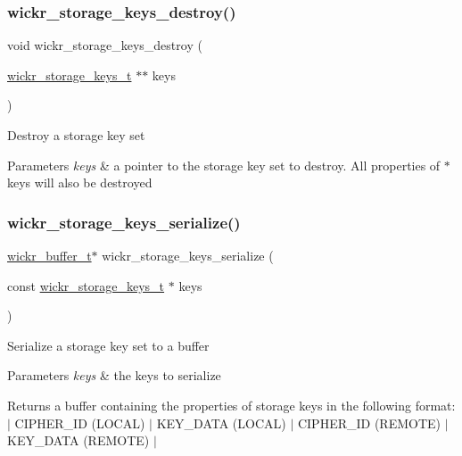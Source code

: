 \subsubsection{\texorpdfstring{wickr\+\_\+storage\+\_\+keys\+\_\+destroy()}{wickr\_storage\_keys\_destroy()}}
{\footnotesize\ttfamily void wickr\+\_\+storage\+\_\+keys\+\_\+destroy (\begin{DoxyParamCaption}\item[{\hyperlink{structwickr__storage__keys}{wickr\+\_\+storage\+\_\+keys\+\_\+t} $\ast$$\ast$}]{keys }\end{DoxyParamCaption})}

Destroy a storage key set


\begin{DoxyParams}{Parameters}
{\em keys} & a pointer to the storage key set to destroy. All properties of \textquotesingle{}$\ast$keys\textquotesingle{} will also be destroyed \\
\hline
\end{DoxyParams}
\mbox{\label{group__wickr__storage__keys_ga10a0d6e13442682b2fecff2ed753c2f6}} 
\subsubsection{\texorpdfstring{wickr\+\_\+storage\+\_\+keys\+\_\+serialize()}{wickr\_storage\_keys\_serialize()}}
{\footnotesize\ttfamily \hyperlink{structwickr__buffer}{wickr\+\_\+buffer\+\_\+t}$\ast$ wickr\+\_\+storage\+\_\+keys\+\_\+serialize (\begin{DoxyParamCaption}\item[{const \hyperlink{structwickr__storage__keys}{wickr\+\_\+storage\+\_\+keys\+\_\+t} $\ast$}]{keys }\end{DoxyParamCaption})}

Serialize a storage key set to a buffer


\begin{DoxyParams}{Parameters}
{\em keys} & the keys to serialize \\
\hline
\end{DoxyParams}
\begin{DoxyReturn}{Returns}
a buffer containing the properties of storage keys in the following format\+: $\vert$ C\+I\+P\+H\+E\+R\+\_\+\+ID (L\+O\+C\+AL) $\vert$ K\+E\+Y\+\_\+\+D\+A\+TA (L\+O\+C\+AL) $\vert$ C\+I\+P\+H\+E\+R\+\_\+\+ID (R\+E\+M\+O\+TE) $\vert$ K\+E\+Y\+\_\+\+D\+A\+TA (R\+E\+M\+O\+TE) $\vert$ 
\end{DoxyReturn}
